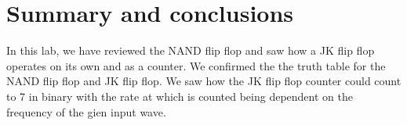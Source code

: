 \documentclass[11pt,letterpaper,onecolumn]{article}
\begin{document}
\section{Summary and conclusions}

In this lab, we have reviewed the NAND flip flop and saw how a JK flip flop operates on its own and as a counter. We confirmed the the truth table for the NAND flip flop and JK flip flop. We saw how the JK flip flop counter could count to 7 in binary with the rate at which is counted being dependent on the frequency of the gien input wave. 






\end{document}
